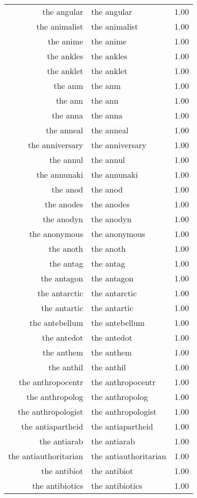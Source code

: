 \begin{table}[ht]
\begin{tabular}{rlr}
  the angular & the angular & 1.00 \\ 
  the animalist & the animalist & 1.00 \\ 
  the anime & the anime & 1.00 \\ 
  the ankles & the ankles & 1.00 \\ 
  the anklet & the anklet & 1.00 \\ 
  the anm & the anm & 1.00 \\ 
  the ann & the ann & 1.00 \\ 
  the anna & the anna & 1.00 \\ 
  the anneal & the anneal & 1.00 \\ 
  the anniversary & the anniversary & 1.00 \\ 
  the annul & the annul & 1.00 \\ 
  the annunaki & the annunaki & 1.00 \\ 
  the anod & the anod & 1.00 \\ 
  the anodes & the anodes & 1.00 \\ 
  the anodyn & the anodyn & 1.00 \\ 
  the anonymous & the anonymous & 1.00 \\ 
  the anoth & the anoth & 1.00 \\ 
  the antag & the antag & 1.00 \\ 
  the antagon & the antagon & 1.00 \\ 
  the antarctic & the antarctic & 1.00 \\ 
  the antartic & the antartic & 1.00 \\ 
  the antebellum & the antebellum & 1.00 \\ 
  the antedot & the antedot & 1.00 \\ 
  the anthem & the anthem & 1.00 \\ 
  the anthil & the anthil & 1.00 \\ 
  the anthropocentr & the anthropocentr & 1.00 \\ 
  the anthropolog & the anthropolog & 1.00 \\ 
  the anthropologist & the anthropologist & 1.00 \\ 
  the antiapartheid & the antiapartheid & 1.00 \\ 
  the antiarab & the antiarab & 1.00 \\ 
  the antiauthoritarian & the antiauthoritarian & 1.00 \\ 
  the antibiot & the antibiot & 1.00 \\ 
  the antibiotics & the antibiotics & 1.00 \\ 

\end{tabular}
\end{table}
